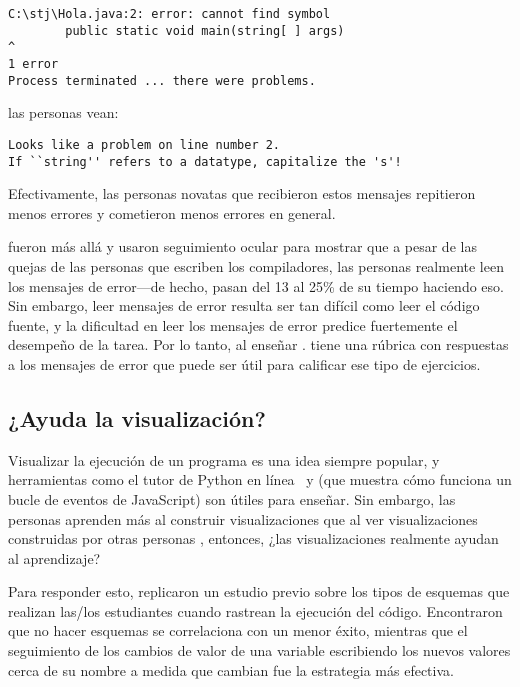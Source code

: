 \begin{verbatim}
C:\stj\Hola.java:2: error: cannot find symbol
        public static void main(string[ ] args)
^
1 error
Process terminated ... there were problems.
\end{verbatim}

\noindent
las personas vean:

\begin{verbatim}
Looks like a problem on line number 2.
If ``string'' refers to a datatype, capitalize the 's'!
\end{verbatim}

\noindent
Efectivamente,
las personas novatas que recibieron estos mensajes repitieron menos errores y cometieron menos errores en general.

\cite{Bari2017} fueron más allá y usaron seguimiento ocular para mostrar que
a pesar de las quejas de las personas que escriben los compiladores,
las personas realmente leen los mensajes de error---de hecho, pasan del 13 al 25\% de su tiempo haciendo eso.
Sin embargo,
leer mensajes de error resulta ser tan difícil como leer el código fuente,
y la dificultad en leer los mensajes de error predice fuertemente el desempeño de la tarea.
Por lo tanto, al enseñar
.
\cite{Marc2011} tiene una rúbrica con respuestas a los mensajes de error que puede ser útil para calificar ese tipo de ejercicios.

\subsection*{¿Ayuda la visualización?}

Visualizar la ejecución de un programa es una idea siempre popular,
y herramientas como el tutor de Python en línea~\cite{Guo2013}
y 
(que muestra cómo funciona un bucle de eventos de JavaScript)
son útiles para enseñar.
Sin embargo,
las personas aprenden más al construir visualizaciones
que al ver visualizaciones construidas por otras personas \cite{Stas1998,Ceti2016},
entonces, ¿las visualizaciones realmente ayudan al aprendizaje?

Para responder esto,
\cite{Cunn2017} replicaron un estudio previo sobre los tipos de esquemas que realizan las/los estudiantes cuando rastrean la ejecución del código.
Encontraron que no hacer esquemas se correlaciona con un menor éxito,
mientras que el seguimiento de los cambios de valor de una variable escribiendo los nuevos valores cerca de su nombre
a medida que cambian fue la estrategia más efectiva.

